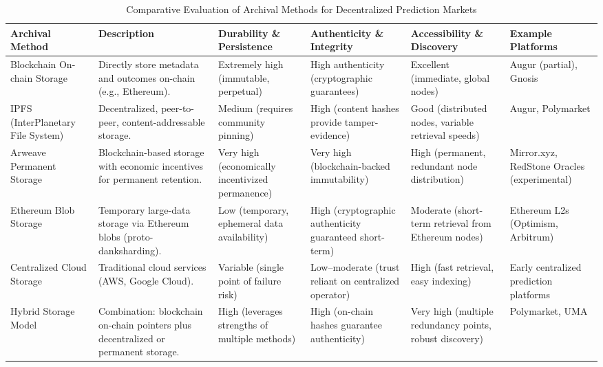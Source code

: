 {\begin{table}[htbp]
    \centering
    \caption{Comparative Evaluation of Archival Methods for Decentralized Prediction Markets}
    \renewcommand{\arraystretch}{1.3}
    \begin{tabular}{
        |p{2.3cm}|
        p{3cm}|
        >{\centering\arraybackslash}p{2.0cm}|
        >{\centering\arraybackslash}p{2.5cm}|
        >{\centering\arraybackslash}p{2.8cm}|
        >{\centering\arraybackslash}p{2.6cm}|
    }
        \hline \textbf{Archival Method} & \textbf{Description} & \textbf{Durability \& Persistence} & \textbf{Authenticity \& Integrity} & \textbf{Accessibility \& Discovery} & \textbf{Example Platforms} \\
        \hline Blockchain On-chain Storage & Directly store metadata and outcomes on-chain (e.g., Ethereum). & Extremely high (immutable, perpetual) & High authenticity (cryptographic guarantees) & Excellent (immediate, global nodes) & Augur (partial), Gnosis \\
        \hline IPFS (InterPlanetary File System) & Decentralized, peer-to-peer, content-addressable storage. & Medium (requires community pinning) & High (content hashes provide tamper-evidence) & Good (distributed nodes, variable retrieval speeds) & Augur, Polymarket \\
        \hline Arweave Permanent Storage & Blockchain-based storage with economic incentives for permanent retention. & Very high (economically incentivized permanence) & Very high (blockchain-backed immutability) & High (permanent, redundant node distribution) & Mirror.xyz, RedStone Oracles (experimental) \\
        \hline Ethereum Blob Storage & Temporary large-data storage via Ethereum blobs (proto-danksharding). & Low (temporary, ephemeral data availability) & High (cryptographic authenticity guaranteed short-term) & Moderate (short-term retrieval from Ethereum nodes) & Ethereum L2s (Optimism, Arbitrum) \\
        \hline Centralized Cloud Storage & Traditional cloud services (AWS, Google Cloud). & Variable (single point of failure risk) & Low–moderate (trust reliant on centralized operator) & High (fast retrieval, easy indexing) & Early centralized prediction platforms \\
        \hline Hybrid Storage Model & Combination: blockchain on-chain pointers plus decentralized or permanent storage. & High (leverages strengths of multiple methods) & High (on-chain hashes guarantee authenticity) & Very high (multiple redundancy points, robust discovery) & Polymarket, UMA \\
        \hline
    \end{tabular}
    \label{tab:archival-methods}
\end{table}

}
